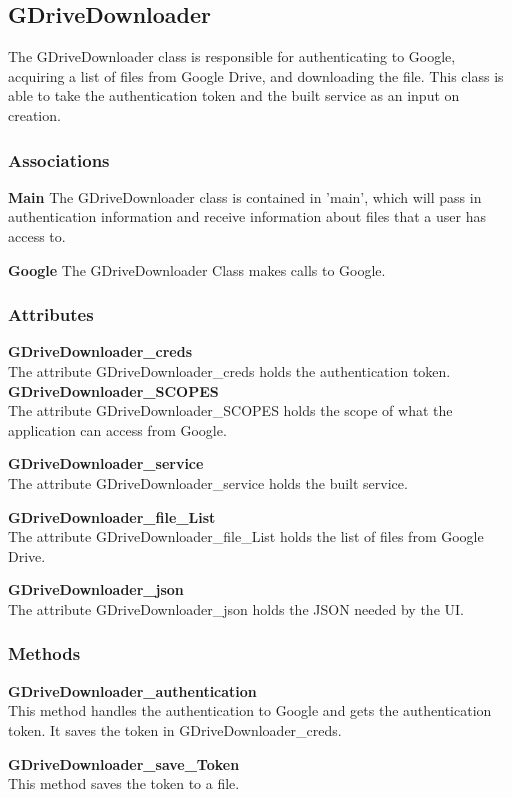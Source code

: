 \subsection{GDriveDownloader}
The GDriveDownloader class is responsible for authenticating to Google, acquiring a list of files from Google Drive, and downloading the file.
This class is able to take the authentication token and the built service as an input on creation.  
\subsubsection{Associations}
\textbf{Main} 
The GDriveDownloader class is contained in 'main', which will pass in authentication information and receive information about files 
that a user has access to.

\textbf{Google} 
The GDriveDownloader Class makes calls to Google.

\subsubsection{Attributes}
\textbf{GDriveDownloader\_creds} \\
The attribute GDriveDownloader\_creds holds the authentication token.
\textbf{GDriveDownloader\_SCOPES} \\
The attribute GDriveDownloader\_SCOPES holds the scope of what the application can access from Google.

\textbf{GDriveDownloader\_service} \\
The attribute GDriveDownloader\_service holds the built service.

\textbf{GDriveDownloader\_file\_List} \\
The attribute GDriveDownloader\_file\_List holds the list of files from Google Drive.

\textbf{GDriveDownloader\_json} \\
The attribute GDriveDownloader\_json holds the JSON needed by the UI. 
\subsubsection{Methods}
\textbf{GDriveDownloader\_authentication} \\
This method handles the authentication to Google and gets the authentication token. It saves the token in GDriveDownloader\_creds.

\textbf{GDriveDownloader\_save\_Token} \\
This method saves the token to a file.

